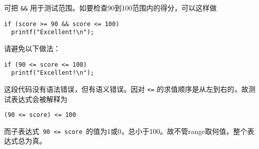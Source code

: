 \begin{frame}[fragile]
可把 \lstinline|&&| 用于测试范围。如要检查90到100范围内的得分，可以这样做
\begin{lstlisting}
if (score >= 90 && score <= 100)
  printf("Excellent!\n");
\end{lstlisting} \pause \vspace{0.1in}
\end{frame}

\begin{frame}[fragile]
请避免以下做法：
\begin{lstlisting}
if (90 <= score <= 100)
  printf("Excellent!\n");
\end{lstlisting}

\pause \vspace{0.5mm}

这段代码没有语法错误，但有语义错误。因对 \lstinline|<=| 的求值顺序是从左到右的，故测试表达式会被解释为
\begin{lstlisting}
(90 <= score) <= 100
\end{lstlisting}
而子表达式\lstinline| 90 <= score |的值为1或0，总小于100。故不管range取何值，整个表达式总为真。
\end{frame}

